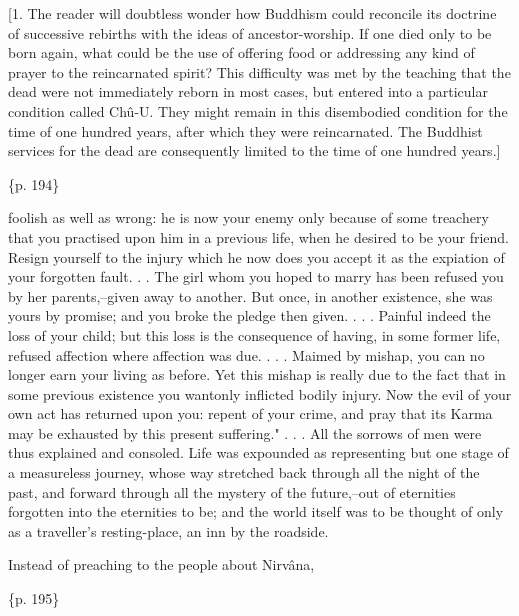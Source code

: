 [1. The reader will doubtless wonder how Buddhism could reconcile its doctrine of successive rebirths with the ideas of ancestor-worship. If one died only to be born again, what could be the use of offering food or addressing any kind of prayer to the reincarnated spirit? This difficulty was met by the teaching that the dead were not immediately reborn in most cases, but entered into a particular condition called Chû-U. They might remain in this disembodied condition for the time of one hundred years, after which they were reincarnated. The Buddhist services for the dead are consequently limited to the time of one hundred years.]

\{p. 194\}

foolish as well as wrong: he is now your enemy only because of some treachery that you practised upon him in a previous life, when he desired to be your friend. Resign yourself to the injury which he now does you accept it as the expiation of your forgotten fault. . . The girl whom you hoped to marry has been refused you by her parents,--given away to another. But once, in another existence, she was yours by promise; and you broke the pledge then given. . . . Painful indeed the loss of your child; but this loss is the consequence of having, in some former life, refused affection where affection was due. . . . Maimed by mishap, you can no longer earn your living as before. Yet this mishap is really due to the fact that in some previous existence you wantonly inflicted bodily injury. Now the evil of your own act has returned upon you: repent of your crime, and pray that its Karma may be exhausted by this present suffering." . . . All the sorrows of men were thus explained and consoled. Life was expounded as representing but one stage of a measureless journey, whose way stretched back through all the night of the past, and forward through all the mystery of the future,--out of eternities forgotten into the eternities to be; and the world itself was to be thought of only as a traveller's resting-place, an inn by the roadside.



Instead of preaching to the people about Nirvâna,

\{p. 195\}

